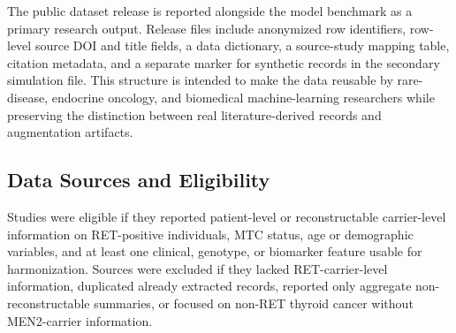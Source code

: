 \documentclass[12pt]{article}
\begin{document}
The public dataset release is reported alongside the model benchmark as a primary research output. Release files include anonymized row identifiers, row-level source DOI and title fields, a data dictionary, a source-study mapping table, citation metadata, and a separate marker for synthetic records in the secondary simulation file. This structure is intended to make the data reusable by rare-disease, endocrine oncology, and biomedical machine-learning researchers while preserving the distinction between real literature-derived records and augmentation artifacts.

\begin{table}[ht]
\centering
\caption{Baseline characteristics of the literature-derived cohort stratified by MTC status.}
\end{table}

\subsection{Data Sources and Eligibility}
Studies were eligible if they reported patient-level or reconstructable carrier-level information on RET-positive individuals, MTC status, age or demographic variables, and at least one clinical, genotype, or biomarker feature usable for harmonization. Sources were excluded if they lacked RET-carrier-level information, duplicated already extracted records, reported only aggregate non-reconstructable summaries, or focused on non-RET thyroid cancer without MEN2-carrier information.
\end{document}

